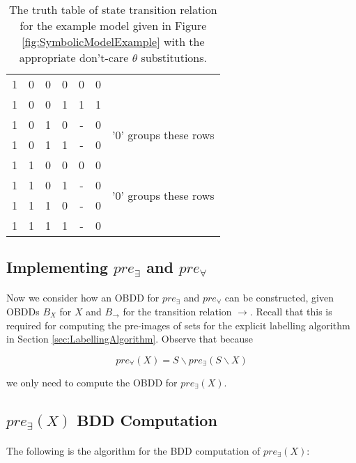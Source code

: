 \documentclass{article}
\theoremstyle{plain}
\theoremstyle{definition}
\begin{document}
\begin{multicols}{2}
\begin{table}[H]
\begin{tabular}{ c c | c c | c | c | p{} }
1 & 0 & 0 & 0 & 0 & 0 & \\
1 & 0 & 0 & 1 & 1 & 1 & \\
\cline{7-7}
1 & 0 & 1 & 0 & - & 0 & \multirow{2}{2cm}{\footnotesize '$0$' groups these rows} \\
1 & 0 & 1 & 1 & - & 0 & \\
\hline

1 & 1 & 0 & 0 & 0 & 0 & \multirow{4}{2cm}{\footnotesize '$0$' groups these rows} \\
1 & 1 & 0 & 1 & - & 0 & \\
1 & 1 & 1 & 0 & - & 0 & \\
1 & 1 & 1 & 1 & - & 0 & \\

\end{tabular}
\caption{The truth table of state transition relation for the example model given in Figure \ref{fig:SymbolicModelExample}  with the appropriate don't-care $\theta$ substitutions.}
\end{table}

\subsection{Implementing $pre_\exists$ and $pre_\forall$}

\paragraph{} Now we consider how an OBDD for $pre_\exists$ and $pre_\forall$ can be constructed, given OBDDs $B_X$ for $X$ and $B_\rightarrow$ for the transition relation $\rightarrow$. Recall that this is required for computing the pre-images of sets for the explicit labelling algorithm in Section \ref{sec:LabellingAlgorithm}. Observe that because

$$pre_\forall(X) = S \backslash pre_\exists(S \backslash X)$$

\noindent we only need to compute the OBDD for $pre_\exists(X)$. 

\subsection{$pre_\exists(X)$ BDD Computation}

\paragraph{} The following is the algorithm for the BDD computation of $pre_\exists(X)$:


\end{multicols}
\end{document}
